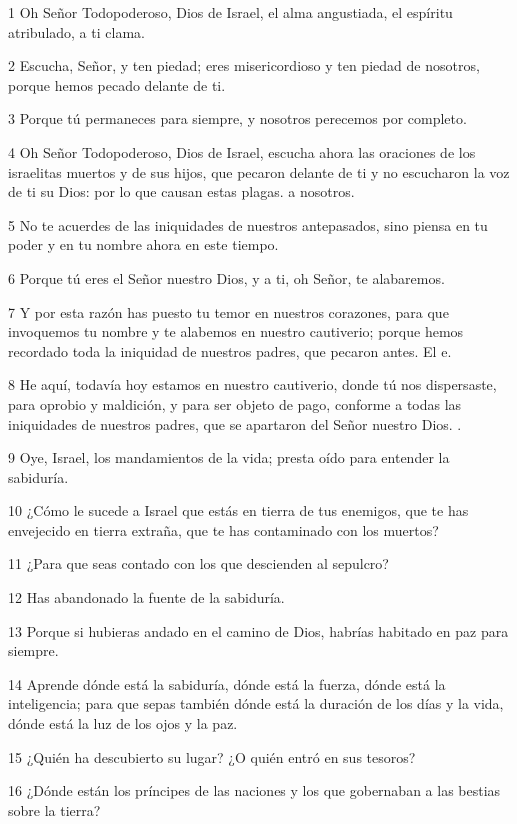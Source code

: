 \par 1 Oh Señor Todopoderoso, Dios de Israel, el alma angustiada, el espíritu atribulado, a ti clama.
\par 2 Escucha, Señor, y ten piedad; eres misericordioso y ten piedad de nosotros, porque hemos pecado delante de ti.
\par 3 Porque tú permaneces para siempre, y nosotros perecemos por completo.
\par 4 Oh Señor Todopoderoso, Dios de Israel, escucha ahora las oraciones de los israelitas muertos y de sus hijos, que pecaron delante de ti y no escucharon la voz de ti su Dios: por lo que causan estas plagas. a nosotros.
\par 5 No te acuerdes de las iniquidades de nuestros antepasados, sino piensa en tu poder y en tu nombre ahora en este tiempo.
\par 6 Porque tú eres el Señor nuestro Dios, y a ti, oh Señor, te alabaremos.
\par 7 Y por esta razón has puesto tu temor en nuestros corazones, para que invoquemos tu nombre y te alabemos en nuestro cautiverio; porque hemos recordado toda la iniquidad de nuestros padres, que pecaron antes. El e.
\par 8 He aquí, todavía hoy estamos en nuestro cautiverio, donde tú nos dispersaste, para oprobio y maldición, y para ser objeto de pago, conforme a todas las iniquidades de nuestros padres, que se apartaron del Señor nuestro Dios. .
\par 9 Oye, Israel, los mandamientos de la vida; presta oído para entender la sabiduría.
\par 10 ¿Cómo le sucede a Israel que estás en tierra de tus enemigos, que te has envejecido en tierra extraña, que te has contaminado con los muertos?
\par 11 ¿Para que seas contado con los que descienden al sepulcro?
\par 12 Has abandonado la fuente de la sabiduría.
\par 13 Porque si hubieras andado en el camino de Dios, habrías habitado en paz para siempre.
\par 14 Aprende dónde está la sabiduría, dónde está la fuerza, dónde está la inteligencia; para que sepas también dónde está la duración de los días y la vida, dónde está la luz de los ojos y la paz.
\par 15 ¿Quién ha descubierto su lugar? ¿O quién entró en sus tesoros?
\par 16 ¿Dónde están los príncipes de las naciones y los que gobernaban a las bestias sobre la tierra?
